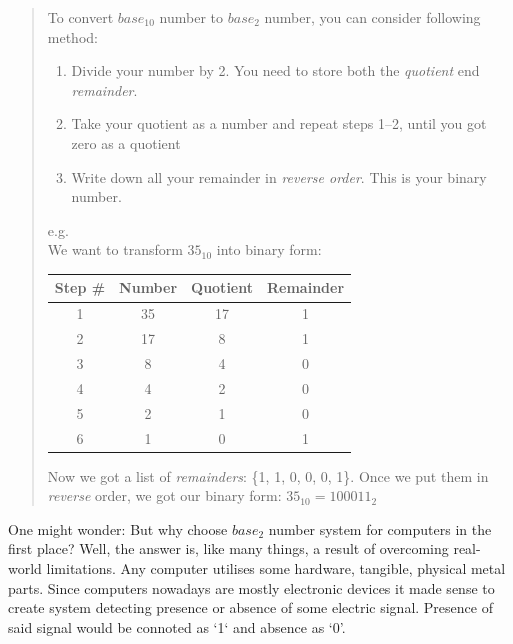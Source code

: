 \documentclass{article}
\begin{document}
            \begin{quote}
                To convert $base_{10}$ number to $base_{2}$ number, you can consider following method:
                \begin{enumerate}
                    \item Divide your number by 2. You need to store both the \emph{quotient} end \emph{remainder}.
                    \item Take your quotient as a number and repeat steps 1--2, until you got zero as a quotient
                    \item Write down all your remainder in \emph{reverse order}. This is your binary number.
                \end{enumerate}

                e.g.\\
                We want to transform $35_{10}$ into binary form:
                
                \begin{longtable}{|c|c|c|c|}
                    \hline
                    Step \# & Number & Quotient & Remainder \\\hline
                    1 & 35 & 17 & 1 \\\hline
                    2 & 17 & 8 & 1 \\\hline
                    3 & 8 & 4 & 0 \\\hline
                    4 & 4 & 2 & 0 \\\hline
                    5 & 2 & 1 & 0 \\\hline
                    6 & 1 & 0 & 1 \\\hline
                \end{longtable}

                Now we got a list of \emph{remainders}: \{1, 1, 0, 0, 0, 1\}. Once we put them in \emph{reverse} order, we got our binary form: $35_{10} = 100011_2$
            \end{quote}
            
    
            One might wonder: But why choose $base_2$ number system for computers in the first place? Well, the answer is, like many things, a result of overcoming
            real-world limitations. Any computer utilises some hardware, tangible, physical metal parts. Since computers nowadays are mostly electronic devices 
            it made sense to create system detecting presence or absence of some electric signal. Presence of said signal would be connoted as `1` and absence as `0'. \par
\end{document}
